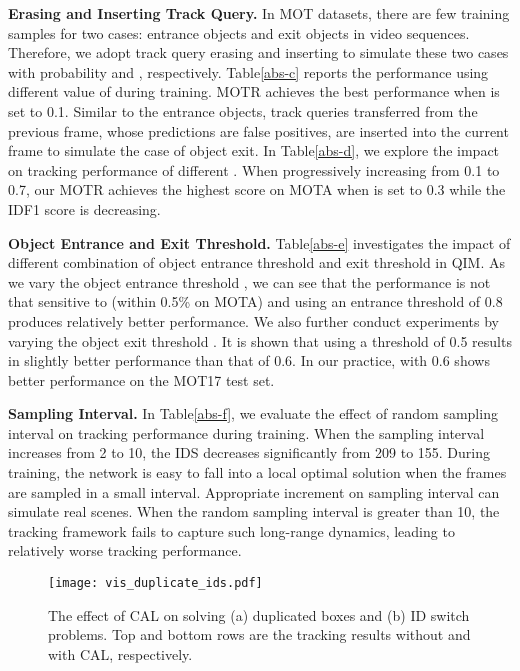 \documentclass[runningheads]{llncs}
\begin{document}
\noindent \textbf{Erasing and Inserting Track Query.} In MOT datasets, there are few training samples for two cases: entrance objects and exit objects in video sequences. Therefore, we adopt track query erasing and inserting to simulate these two cases with probability  and , respectively. Table\;\ref{abs-c} reports the performance using different value of  during training. MOTR achieves the best performance when  is set to 0.1. Similar to the entrance objects, track queries transferred from the previous frame, whose predictions are false positives, are inserted into the current frame to simulate the case of object exit. In Table\;\ref{abs-d}, we explore the impact on tracking performance of different . When progressively increasing  from 0.1 to 0.7, our MOTR achieves the highest score on MOTA when  is set to 0.3
while the IDF1 score is decreasing.


\noindent \textbf{Object Entrance and Exit Threshold.}
Table\;\ref{abs-e} investigates the impact of different combination of object entrance threshold  and exit threshold  in QIM. As we vary the object entrance threshold , we can see that the performance is not that sensitive to  (within 0.5\% on MOTA) and using an entrance threshold of 0.8 produces relatively better performance. We also further conduct experiments by varying the object exit threshold . It is shown that using a threshold of 0.5 results in slightly better performance than that of 0.6. In our practice,  with 0.6 shows better performance on the MOT17 test set.

\noindent \textbf{Sampling Interval.}
In Table\;\ref{abs-f}, we evaluate the effect of random sampling interval on tracking performance during training. When the sampling interval increases from 2 to 10, the IDS decreases significantly from 209 to 155. During training, the network is easy to fall into a local optimal solution when the frames are sampled in a small interval. Appropriate increment on sampling interval can simulate real scenes. When the random sampling interval is greater than 10, the tracking framework fails to capture such long-range dynamics, leading to relatively worse tracking performance.

\begin{figure}[t]
  \centering
  \texttt{[image: vis\_duplicate\_ids.pdf]}
  \vspace{-0.8cm}
  \caption{The effect of CAL on solving (a) duplicated boxes and (b) ID switch problems. Top and bottom rows are the tracking results without and with CAL, respectively.}
  \label{vis_duplicate}
\end{figure}
\end{document}
